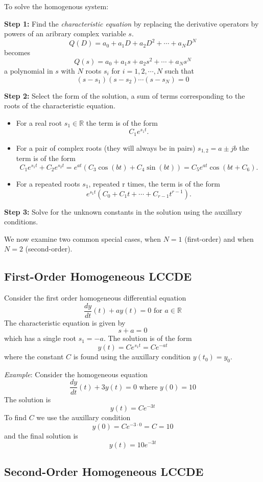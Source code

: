 To solve the homogenous system:

\textbf{Step 1:} Find the \emph{characteristic equation} by replacing the derivative operators by powers of an aribrary complex variable $s$.
\[
Q(D) = a_0 + a_1D + a_2D^2 + \cdots + a_ND^N
\]
becomes
\[
Q(s) = a_0 + a_1s + a_2s^2 + \cdots + a_Ns^N
\]
a polynomial in $s$ with $N$ roots $s_i$ for $i = 1, 2, \cdots, N$ such that
\[
(s - s_1)(s-s_2)\cdots(s-s_N) = 0
\]

\textbf{Step 2:} Select the form of the solution, a sum of terms corresponding to the roots of the characteristic equation.

\begin{itemize}
\item For a real root $s_1\in \mathbb{R}$ the term is of the form
  \[
  C_1 e^{s_1 t}.
  \]
\item For a pair of complex roots (they will always be in pairs) $s_{1,2} = a \pm jb$ the term is of the form
  \[
  C_1 e^{s_1 t} + C_2 e^{s_2 t} = e^{a t}\left(C_3\cos(bt) + C_4\sin(bt)\right) = C_5 e^{a t}\cos(bt + C_6).
  \]
\item For a repeated roots $s_1$, repeated r times, the term is of the form
  \[
  e^{s_1 t} (C_0 + C_1 t + \cdots + C_{r-1} t^{r-1}).\]
\end{itemize}

\textbf{Step 3:} Solve for the unknown constants in the solution using the auxillary conditions. 

We now examine two common special cases, when $N=1$ (first-order) and when $N=2$ (second-order).

\subsection*{First-Order Homogeneous LCCDE}

Consider the first order homogeneous differential equation
\[
\frac{dy}{dt}(t) + ay(t) = 0 \mbox{ for } a \in \mathbb{R}
\]
The characteristic equation is given by
\[
s + a = 0
\]
which has a single root $s_1 = -a$. The solution is of the form
\[
y(t) = Ce^{s_1 t} = Ce^{-a t} 
\]
where the constant $C$ is found using the auxillary condition $y(t_0) = y_0$.

\textit{Example}: Consider the homogeneous equation
\[
\frac{dy}{dt}(t) + 3y(t) = 0 \mbox{ where } y(0) = 10
\]
The solution is
\[
y(t) = Ce^{-3 t} 
\]
To find $C$ we use the auxillary condition
\[
y(0) = Ce^{-3 \cdot 0} = C = 10
\]
and the final solution is
\[
y(t) = 10e^{-3 t} 
\]
\subsection*{Second-Order Homogeneous LCCDE}

